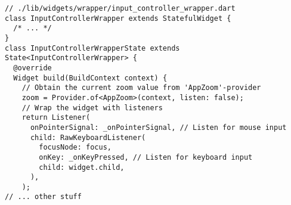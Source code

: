 \begin{lstlisting}
// ./lib/widgets/wrapper/input_controller_wrapper.dart
class InputControllerWrapper extends StatefulWidget { 
  /* ... */
}
class InputControllerWrapperState extends State<InputControllerWrapper> {
  @override
  Widget build(BuildContext context) {
    // Obtain the current zoom value from 'AppZoom'-provider
    zoom = Provider.of<AppZoom>(context, listen: false);
    // Wrap the widget with listeners
    return Listener(
      onPointerSignal: _onPointerSignal, // Listen for mouse input
      child: RawKeyboardListener(
        focusNode: focus,
        onKey: _onKeyPressed, // Listen for keyboard input
        child: widget.child,
      ),
    );
// ... other stuff
\end{lstlisting}
